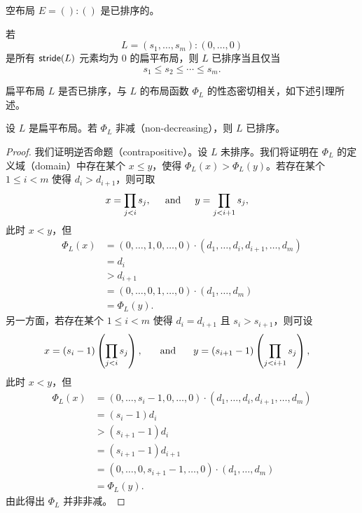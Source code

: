 \begin{example}
    空布局 $E = ():()$ 是已排序的。
\end{example}

\begin{example}
    若
    \[L = (s_1,\dots,s_m):(0,\dots,0)\]
    是所有 $\mathsf{stride}(L)$ 元素均为 $0$ 的扁平布局，则 $L$ 已排序当且仅当
    \[
    s_1 \leq s_2 \leq \cdots \leq s_m.
    \]
\end{example}

扁平布局 $L$ 是否已排序，与 $L$ 的布局函数 $\Phi_L$ 的性态密切相关，如下述引理所述。
\begin{lemma}
    设 $L$ 是扁平布局。若 $\Phi_L$ 非减（non-decreasing），则 $L$ 已排序。
\end{lemma}
\begin{proof}
我们证明逆否命题（contrapositive）。设 $L$ 未排序。我们将证明在 $\Phi_L$ 的定义域（domain）中存在某个 $x \leq y$，使得 $\Phi_L(x)>\Phi_L(y)$。若存在某个 $1 \leq i < m$ 使得 $d_i > d_{i+1}$，则可取
    \begin{align*}
    x & = \prod_{j<i}s_j, \hspace{0.2in}\text{and}\hspace{0.2in} y = \prod_{j<i+1}s_j,
    \end{align*}
    此时 $x < y$，但
    \begin{align*}
    \Phi_L(x) & = (0,\dots,1,0,\dots,0) \cdot (d_1,\dots,d_i,d_{i+1},\dots,d_m) \\
    & = d_i\\
    & > d_{i+1}\\
    & = (0,\dots,0,1,\dots,0) \cdot (d_1,\dots,d_m)\\
    & = \Phi_L(y).
    \end{align*}
    另一方面，若存在某个 $1 \leq i < m$ 使得 $d_i = d_{i+1}$ 且 $s_i > s_{i+1}$，则可设
    \begin{align*}
    x & = (s_i-1)\left(\prod_{j<i} s_j\right),\hspace{0.2in} \text{ and } \hspace{0.2in}y = (s_{i+1} - 1)\left( \prod_{j<i+1}s_j\right),
    \end{align*}
    此时 $x < y$，但
    \begin{align*}
    \Phi_L(x) & = (0,\dots,s_i-1,0,\dots,0) \cdot (d_1,\dots,d_i,d_{i+1},\dots,d_m) \\
    & = (s_i-1)d_i\\
    & > (s_{i+1}-1)d_{i}\\
    & = (s_{i+1}-1)d_{i+1}\\
    & = (0,\dots,0,s_{i+1}-1,\dots,0) \cdot (d_1,\dots,d_m)\\
    & = \Phi_L(y).
    \end{align*}
    由此得出 $\Phi_L$ 并非非减。
\end{proof}

